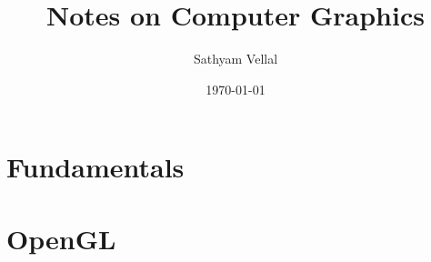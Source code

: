 \documentclass[11pt]{article}
\title{Notes on Computer Graphics}
\author{Sathyam Vellal}
\date{\today}
\begin{document}
\maketitle

\section{Fundamentals}

\section{OpenGL}
\end{document}
